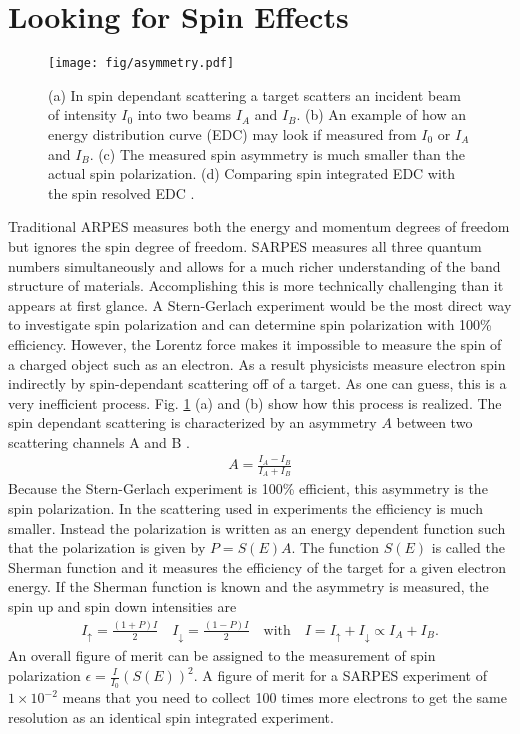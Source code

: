 \documentclass[12pt]{article}
\begin{document}
\section{Looking for Spin Effects}
\begin{figure}[h]
  \centering
  \texttt{[image: fig/asymmetry.pdf]}
  \caption{(a) In spin dependant scattering a target scatters an incident beam of intensity $I_0$ into two beams $I_A$ and $I_B$.  (b) An example of how an energy distribution curve (EDC) may look if measured from $I_0$ or $I_A$ and $I_B$.  (c) The measured spin asymmetry is much smaller than the actual spin polarization.  (d) Comparing spin integrated EDC with the spin resolved EDC \cite{Okuda-Kimura}.}
  \label{fig:asymmetry}
\end{figure}
Traditional ARPES measures both the energy and momentum degrees of freedom but ignores the spin degree of freedom.
SARPES measures all three quantum numbers simultaneously and allows for a much richer understanding of the band structure of materials.
Accomplishing this is more technically challenging than it appears at first glance.
A Stern-Gerlach experiment would be the most direct way to investigate spin polarization and can determine spin polarization with 100\% efficiency.
However, the Lorentz force makes it impossible to measure the spin of a charged object such as an electron.
As a result physicists measure electron spin indirectly by spin-dependant scattering off of a target.
As one can guess, this is a very inefficient process.
Fig. \ref{fig:asymmetry} (a) and (b) show how this process is realized.
The spin dependant scattering is characterized by an asymmetry $A$ between two scattering channels A and B \cite{Okuda-Kimura}.
\begin{align}
  A=\frac{I_A-I_B}{I_A+I_B}
\end{align}
Because the Stern-Gerlach experiment is 100\% efficient, this asymmetry is the spin polarization.
In the scattering used in experiments the efficiency is much smaller.
Instead the polarization is written as an energy dependent function such that the polarization is given by $P=S(E)A$.
The function $S(E)$ is called the Sherman function and it measures the efficiency of the target for a given electron energy.
If the Sherman function is known and the asymmetry is measured, the spin up and spin down intensities are
\begin{align}
  I_{\uparrow}=\frac{(1+P)I}{2}\quad I_{\downarrow}=\frac{(1-P)I}{2}\quad \text{with}\quad I=I_{\uparrow}+I_{\downarrow}\propto I_A+I_B\text{.}
\end{align}
An overall figure of merit can be assigned to the measurement of spin polarization $\epsilon=\frac{I}{I_0}(S(E))^2$.
A figure of merit for a SARPES experiment of $1\times10^{-2}$ means that you need to collect 100 times more electrons to get the same resolution as an identical spin integrated experiment.
\end{document}
